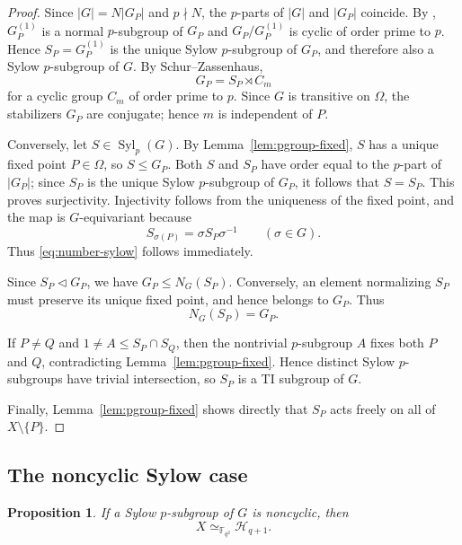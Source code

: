 \documentclass[11pt]{amsart}
\newtheorem{proposition}[theorem]{Proposition}
\theoremstyle{remark}
\newcommand{\F}{\mathbb F}
\newcommand{\Syl}{\operatorname{Syl}}
\newcommand{\cH}{\mathcal H}
\begin{document}
\begin{proof}
Since $|G|=N|G_P|$ and $p\nmid N$, the $p$-parts of $|G|$ and $|G_P|$
coincide.  By \cite[Proposition~3.8.5]{Stichtenoth}, $G_P^{(1)}$ is a
normal $p$-subgroup of $G_P$ and $G_P/G_P^{(1)}$ is cyclic of order
prime to $p$.  Hence $S_P=G_P^{(1)}$ is the unique Sylow $p$-subgroup
of $G_P$, and therefore also a Sylow $p$-subgroup of $G$.  By
Schur--Zassenhaus,
\[
          G_P=S_P\rtimes C_m
\]
for a cyclic group $C_m$ of order prime to $p$.  Since $G$ is transitive
on $\Omega$, the stabilizers $G_P$ are conjugate; hence $m$ is
independent of $P$.

Conversely, let $S\in\Syl_p(G)$.  By Lemma~\ref{lem:pgroup-fixed}, $S$
has a unique fixed point $P\in\Omega$, so $S\le G_P$.  Both $S$ and
$S_P$ have order equal to the $p$-part of $|G_P|$; since $S_P$ is the
unique Sylow $p$-subgroup of $G_P$, it follows that $S=S_P$.  This proves
surjectivity.  Injectivity follows from the uniqueness of the fixed
point, and the map is $G$-equivariant because
\[
          S_{\sigma(P)}=\sigma S_P\sigma^{-1}
          \qquad(\sigma\in G).
\]
Thus \eqref{eq:number-sylow} follows immediately.

Since $S_P\triangleleft G_P$, we have $G_P\le N_G(S_P)$.  Conversely,
an element normalizing $S_P$ must preserve its unique fixed point, and
hence belongs to $G_P$.  Thus
\[
          N_G(S_P)=G_P.
\]

If $P\ne Q$ and $1\ne A\le S_P\cap S_Q$, then the nontrivial
$p$-subgroup $A$ fixes both $P$ and $Q$, contradicting
Lemma~\ref{lem:pgroup-fixed}.  Hence distinct Sylow $p$-subgroups have
trivial intersection, so $S_P$ is a TI subgroup of $G$.

Finally, Lemma~\ref{lem:pgroup-fixed} shows directly that $S_P$ acts
freely on all of $X\setminus\{P\}$.
\end{proof}

\subsection{The noncyclic Sylow case}

\begin{proposition}\label{prop:noncyclic}
If a Sylow $p$-subgroup of $G$ is noncyclic, then
\[
          X\simeq_{\F_{q^2}}\cH_{q+1}.
\]
\end{proposition}
\end{document}
